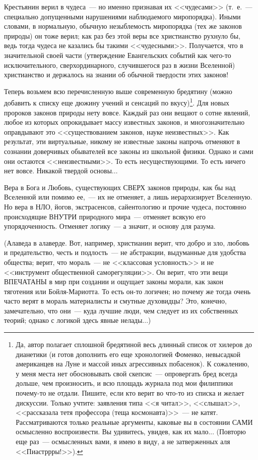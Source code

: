 \documentclass{scrbook}
\newcommand{\flqq}{<<}
\newcommand{\frqq}{>>}
\newcommand{\mdash}{~--- }
\newcommand{\commamdash}{~--- } %
\begin{document}
Крестьянин верил в чудеса{\mdash}но именно признавая их {\flqq}чудесами{\frqq} (т.~е.{\mdash}специально допущенными нарушениями наблюдаемого миропорядка). Иными словами, в нормальную, обычную незыблемость миропорядка (тех же законов природы) он тоже верил; как раз без этой веры все христианство рухнуло бы, ведь тогда чудеса не казались бы такими {\flqq}чудесными{\frqq}. Получается, что в значительной своей части (утверждение Евангельских событий как чего-то исключительного, сверхординарного, случившегося раз в жизни Вселенной) христианство и держалось на знании об обычной твердости этих законов!

Теперь возьмем всю перечисленную выше современную бредятину (можно добавить к списку еще дюжину учений и сенсаций по вкусу)\footnote{Да, автор полагает сплошной бредятиной весь длинный список от хилеров до дианетики (и готов дополнить его еще хронологией Фоменко, невысадкой американцев на Луне и массой иных агрессивных побасенок). К сожалению, у меня места нет обосновывать свой скепсис{\mdash}опровергать бред всегда дольше, чем произносить, и всю площадь журнала под мои филиппики почему-то не отдали. Пишите, если кто верит во что-то из списка и желает дискуссии. Только учтите: заявления типа {\flqq}я читал{\frqq}, {\flqq}слышал{\frqq}, {\flqq}рассказала тетя профессора (теща космонавта){\frqq}{\mdash}не катят. Рассматриваются только реальные аргументы, каковые вы в состоянии САМИ осмысленно воспроизвести. Вы удивитесь, увидев, как их мало... (Повторю еще раз{\mdash}осмысленных вами, я имею в виду, а не затверженных аля {\flqq}Пиастррры!{\frqq}).}. Для новых пророков законов природы нету вовсе. Каждый раз они вещают о сотне явлений, любое из которых опрокидывает массу известных законов, и многозначительно оправдывают это {\flqq}существованием законов, науке неизвестных{\frqq}. Как результат, эти виртуальные, никому не известные законы напрочь отменяют в сознании доверчивых обывателей все законы из школьной физики. Однако и сами они остаются {\flqq}неизвестными{\frqq}. То есть несуществующими. То есть ничего нет вовсе. Никакой твердой основы...

Вера в Бога и Любовь, существующих СВЕРХ законов природы, как бы над Вселенной или помимо ее,{\commamdash}их не отменяет, а лишь иерархизирует Вселенную. Но вера в НЛО, йогов, экстрасенсов, сайентологию и прочие чудеса, постоянно происходящие ВНУТРИ природного мира{\mdash}отменяет всякую его упорядоченность. Отменяет логику{\mdash}а значит, и основу для разума.

(Алаведа в алаверде. Вот, например, христианин верит, что добро и зло, любовь и предательство, честь и подлость{\mdash}не абстракции, выдуманные для удобства общества; верит, что мораль{\mdash}не {\flqq}классовая условность{\frqq} и не {\flqq}инструмент общественной саморегуляции{\frqq}. Он верит, что эти вещи ВПЕЧАТАНЫ в мир при создании и ощущает законы морали, как закон тяготения или Бойля-Мариотта. То есть он-то логичен; но почему же тогда очень часто верят в мораль материалисты и смутные духовидцы? Это, конечно, замечательно, что они{\mdash}куда лучшие люди, чем следует из их собственных теорий; однако с логикой здесь явные нелады...)
\end{document}
